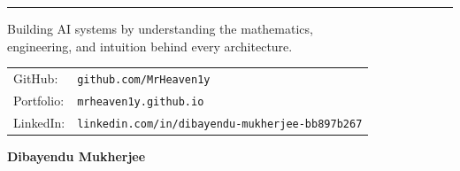 \documentclass[11pt]{article}
\begin{document}
\vfill

\begin{center}

\rule{0.6\textwidth}{0.5pt}

\vspace{0.12in}

{\fontsize{11}{13}\selectfont\color{brandgray}
Building AI systems by understanding the mathematics,\\
engineering, and intuition behind every architecture.
}

\vspace{0.12in}

{\fontsize{10}{12}\selectfont\color{brandgray}
\begin{tabular}{@{}l l}
GitHub: & \texttt{github.com/MrHeaven1y} \\
Portfolio: & \texttt{mrheaven1y.github.io} \\
LinkedIn: & \texttt{linkedin.com/in/dibayendu-mukherjee-bb897b267}
\end{tabular}
}

\vspace{0.12in}

{\fontsize{14}{16}\selectfont\color{brandnavy}\textbf{Dibayendu Mukherjee}}

\end{center}

\vspace*{0.2in}
\end{document}
